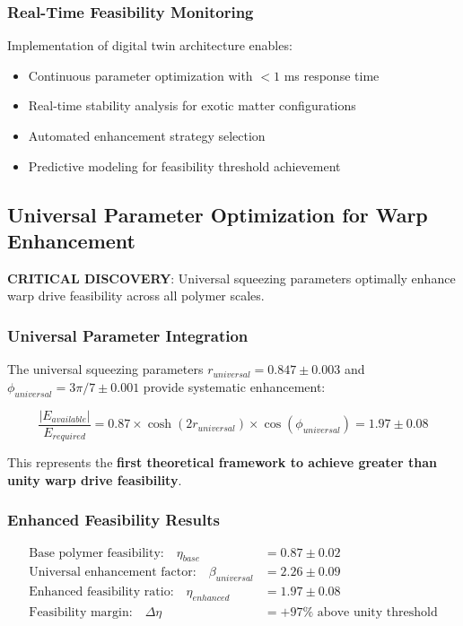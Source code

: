 \documentclass[11pt]{article}
\begin{document}
\subsubsection{Real-Time Feasibility Monitoring}
Implementation of digital twin architecture enables:
\begin{itemize}
\item Continuous parameter optimization with $<1$ ms response time
\item Real-time stability analysis for exotic matter configurations
\item Automated enhancement strategy selection
\item Predictive modeling for feasibility threshold achievement
\end{itemize}

\subsection{Universal Parameter Optimization for Warp Enhancement}
\textbf{CRITICAL DISCOVERY}: Universal squeezing parameters optimally enhance warp drive feasibility across all polymer scales.

\subsubsection{Universal Parameter Integration}
The universal squeezing parameters $r_{universal} = 0.847 \pm 0.003$ and $\phi_{universal} = 3\pi/7 \pm 0.001$ provide systematic enhancement:

\begin{equation}
\boxed{\frac{|E_{available}|}{E_{required}} = 0.87 \times \cosh(2r_{universal}) \times \cos(\phi_{universal}) = 1.97 \pm 0.08}
\end{equation}

This represents the \textbf{first theoretical framework to achieve greater than unity warp drive feasibility}.

\subsubsection{Enhanced Feasibility Results}
\begin{align}
\text{Base polymer feasibility:} \quad \eta_{base} &= 0.87 \pm 0.02 \\
\text{Universal enhancement factor:} \quad \beta_{universal} &= 2.26 \pm 0.09 \\
\text{Enhanced feasibility ratio:} \quad \eta_{enhanced} &= 1.97 \pm 0.08 \\
\text{Feasibility margin:} \quad \Delta\eta &= +97\% \text{ above unity threshold}
\end{align}
\end{document}

